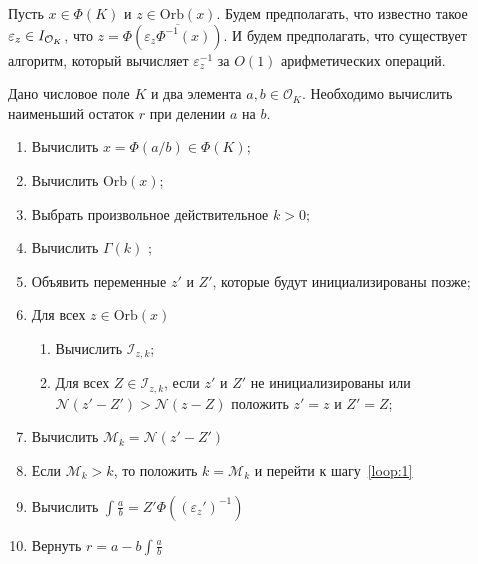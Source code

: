 \documentclass[_00_dissertation.tex]{subfiles}
\begin{document}
\begin{remark}
    Пусть $x \in \Phi(K)$ и $z \in \textrm{Orb}(x)$.
    Будем предполагать, что известно такое $\varepsilon_z \in I_{\mathcal{O}_K}$, что $z = \Phi(\overline{\varepsilon_z \Phi^{-1}(x)})$.
    И будем предполагать, что существует алгоритм, который вычисляет $\varepsilon_z^{-1}$ за $O(1)$ арифметических операций.
\end{remark}

\begin{algorithm}\label{algorithm:least_norm_remainder}
    Дано числовое поле $K$ и два элемента $a, b \in \mathcal{O}_K$.
    Необходимо вычислить наименьший остаток $r$ при делении $a$ на $b$.

    \begin{enumerate}
        \item Вычислить $x = \Phi(a/b) \in \Phi(K)$;
        
        \item Вычислить $\textrm{Orb}(x)$;

        \item Выбрать произвольное действительное $k > 0$;

        \item Вычислить $\Gamma(k)$ \label{loop:1};

        \item Объявить переменные $z'$ и $Z'$, которые будут инициализированы позже;

        \item Для всех $z \in \textrm{Orb}(x)$
        \begin{enumerate}
            \item Вычислить $\mathcal{I}_{z, k}$;

            \item Для всех $Z \in \mathcal{I}_{z, k}$, если $z'$ и $Z'$ не инициализированы или $\mathcal{N}(z' - Z') > \mathcal{N}(z - Z)$ положить $z' = z$ и $Z' = Z$;
        \end{enumerate}

        \item Вычислить $\mathcal{M}_k = \mathcal{N}(z' - Z')$
        
        \item Если $\mathcal{M}_k > k$, то положить $k = \mathcal{M}_k$ и перейти к шагу~\ref{loop:1}

        \item Вычислить $\int{\frac{a}{b}} = Z'\Phi((\varepsilon_z')^{-1})$

        \item Вернуть $r = a - b \int{\frac{a}{b}}$
    \end{enumerate}
\end{algorithm}
\end{document}
